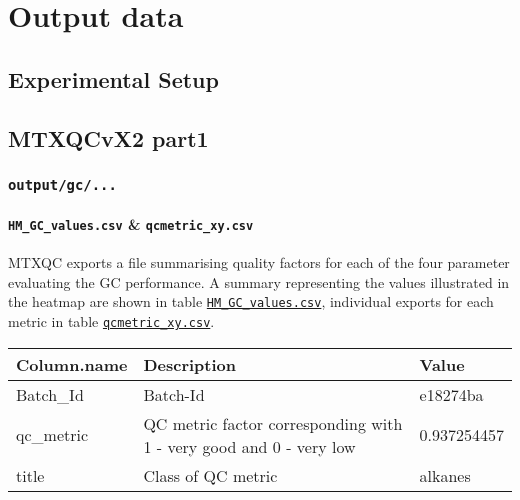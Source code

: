 \documentclass[]{book}
\let\oldparagraph\paragraph
\renewcommand{\paragraph}[1]{\oldparagraph{#1}\mbox{}}
\begin{document}
\hypertarget{output-data}{%
\section{Output data}\label{output-data}}

\hypertarget{experimental-setup}{%
\subsection{Experimental Setup}\label{experimental-setup}}

\hypertarget{mtxqcvx2-part1}{%
\subsection{MTXQCvX2 part1}\label{mtxqcvx2-part1}}

\hypertarget{outputgc...}{%
\subsubsection{\texorpdfstring{\texttt{output/gc/...}}{output/gc/...}}\label{outputgc...}}

\hypertarget{hm_gc_values.csv-qcmetric_xy.csv}{%
\paragraph{\texorpdfstring{\texttt{HM\_GC\_values.csv} \& \texttt{qcmetric\_xy.csv}}{HM\_GC\_values.csv \& qcmetric\_xy.csv}}\label{hm_gc_values.csv-qcmetric_xy.csv}}

MTXQC exports a file summarising quality factors for each of the four parameter evaluating the GC performance. A summary representing the values illustrated in the heatmap are shown in table \href{@ref(tab:o_hm_gc)}{\texttt{HM\_GC\_values.csv}}, individual exports for each metric in table \href{@ref(tab:o_gc_metric)}{\texttt{qcmetric\_xy.csv}}.

\begin{tabu} to 
\toprule
Column.name & Description & Value\\
\midrule
{}  Batch\_Id & Batch-Id & e18274ba\\
qc\_metric & QC metric factor corresponding with 1 - very good and 0 - very low & 0.937254457\\
  title & Class of QC metric & alkanes\\
\bottomrule
\end{tabu}
\end{document}
